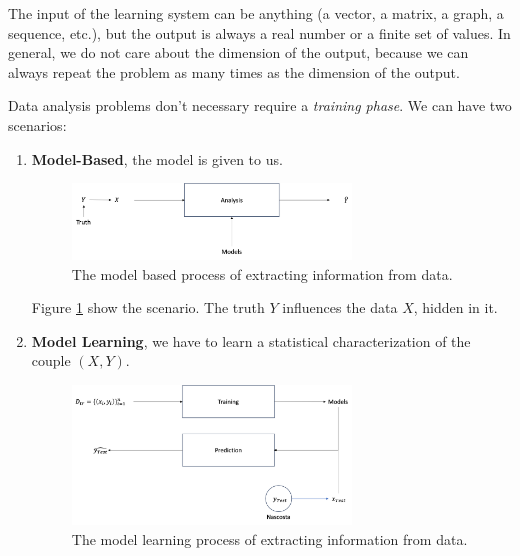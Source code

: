 The input of the learning system can be anything (a vector, a matrix, a graph, a sequence, etc.), but the output is always a real number or a finite set of values. In general,
we do not care about the dimension of the output, because we can always repeat the problem as many times as the dimension of the output.


Data analysis problems don't necessary require a \textit{training phase}. We can have two scenarios:
\begin{enumerate}
    \item \textbf{Model-Based}, the model is given to us.

          \begin{figure}
              \centering
              \includegraphics[width=0.7\textwidth]{./figures/chapter_2/modelbased.png}
              \caption{The model based process of extracting information from data.}
              \label{fig:modelbased}
          \end{figure}

          Figure \ref{fig:modelbased} show the scenario. The truth $Y$ influences the data $X$, hidden in it.


    \item \textbf{Model Learning}, we have to learn a statistical characterization of the couple $(X,Y)$.

          \begin{figure}
              \centering
              \includegraphics[width=0.7\textwidth]{./figures/chapter_2/modellearning.png}
              \caption{The model learning process of extracting information from data.}
              \label{fig:modellearning}
          \end{figure}


\end{enumerate}
